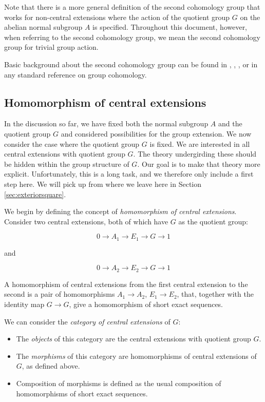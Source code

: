 Note that there is a more general definition of the second cohomology
group that works for non-central extensions where the action of the
quotient group $G$ on the abelian normal subgroup $A$ is
specified. Throughout this document, however, when referring to the
second cohomology group, we mean the second cohomology group for
trivial group action.

Basic background about the second cohomology group can be found in
\cite{Baer38}, \cite{Karpilovsky}, \cite{DummitFoote}, or in any
standard reference on group cohomology.

\subsection{Homomorphism of central extensions}\label{sec:homomorphism-central-extensions}

In the discussion so far, we have fixed both the normal subgroup $A$
and the quotient group $G$ and considered possibilities for the group
extension. We now consider the case where the quotient group $G$ is
fixed. We are interested in all central extensions with quotient group
$G$. The theory undergirding these should be hidden within the group
structure of $G$. Our goal is to make that theory more
explicit. Unfortunately, this is a long task, and we therefore only
include a first step here. We will pick up from where we leave here in
Section \ref{sec:exteriorsquare}.

We begin by defining the concept of {\em homomorphism of central
  extensions}. Consider two central extensions, both of which have $G$
as the quotient group:

$$0 \to A_1 \to E_1 \to G \to 1$$

and

$$0 \to A_2 \to E_2 \to G \to 1$$

A homomorphism of central extensions from the first central extension
to the second is a pair of homomorphisms $A_1 \to A_2$, $E_1 \to E_2$,
that, together with the identity map $G \to G$, give a homomorphism of
short exact sequences.

We can consider the {\em category of central extensions} of $G$:

\begin{itemize}
\item The {\em objects} of this category are the central extensions
  with quotient group $G$.
\item The {\em morphisms} of this category are homomorphisms of
  central extensions of $G$, as defined above.
\item Composition of morphisms is defined as the usual composition of
  homomorphisms of short exact sequences.
\end{itemize}

